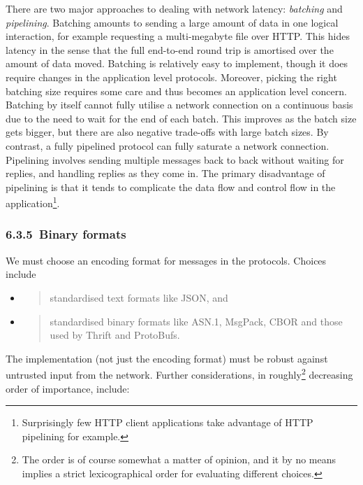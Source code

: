 \documentclass[11pt,a4paper]{article}
\begin{document}
There are two major approaches to dealing with network latency:
\emph{batching} and \emph{pipelining}. Batching amounts to sending a
large amount of data in one logical interaction, for example requesting
a multi-megabyte file over HTTP. This hides latency in the sense that
the full end-to-end round trip is amortised over the amount of data
moved. Batching is relatively easy to implement, though it does require
changes in the application level protocols. Moreover, picking the right
batching size requires some care and thus becomes an application level
concern. Batching by itself cannot fully utilise a network connection on
a continuous basis due to the need to wait for the end of each batch.
This improves as the batch size gets bigger, but there are also negative
trade-offs with large batch sizes. By contrast, a fully pipelined
protocol can fully saturate a network connection. Pipelining involves
sending multiple messages back to back without waiting for replies, and
handling replies as they come in. The primary disadvantage of pipelining
is that it tends to complicate the data flow and control flow in the
application\footnote{Surprisingly few HTTP client applications take
  advantage of HTTP pipelining for example.}.

\hypertarget{binary-formats}{%
\subsubsection{​6.3.5​~Binary formats}\label{binary-formats}}

We must choose an encoding format for messages in the protocols. Choices
include

\begin{itemize}
\item
  \begin{quote}
  standardised text formats like JSON, and
  \end{quote}
\item
  \begin{quote}
  standardised binary formats like ASN.1, MsgPack, CBOR and those used
  by Thrift and ProtoBufs.
  \end{quote}
\end{itemize}

The implementation (not just the encoding format) must be robust against
untrusted input from the network. Further considerations, in
roughly\footnote{The order is of course somewhat a matter of opinion,
  and it by no means implies a strict lexicographical order for
  evaluating different choices.} decreasing order of importance,
include:
\end{document}
